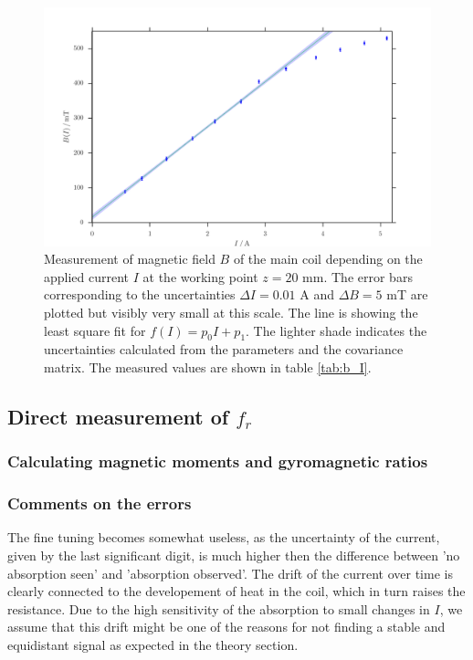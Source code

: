 \begin{figure}[H]
    \includegraphics[width=\textwidth]{figures/b_I.pdf}
    \caption{   
        Measurement of magnetic field $B$ of the main coil depending on the applied current 
        $I$ at the working point $z = 20$ mm. The error bars corresponding 
        to the uncertainties $\Delta I = 0.01$ A 
        and $\Delta B = 5$ mT are plotted but visibly very small at this scale. 
        The line is showing the least square fit for $f(I) = p_0 I + p_1$. The 
        lighter shade indicates the uncertainties calculated from the parameters 
        and the covariance matrix. 
        The measured values are shown in table \ref{tab:b_I}.
        }
    \label{fig:b_I}
\end{figure}


\subsection{Direct measurement of $f_r$}
\subsubsection{Calculating magnetic moments and gyromagnetic ratios}





\subsubsection{Comments on the errors}
The fine tuning becomes somewhat useless, as the uncertainty of the current, given by the last 
significant digit, is much higher then the difference between 'no absorption seen' and 
'absorption observed'. The drift of the current over time is clearly connected to the developement 
of heat in the coil, which in turn raises the resistance. Due to the high sensitivity of the absorption 
to small changes in $I$, we assume that this drift might be one of the reasons for not finding 
a stable and equidistant signal as expected in the theory section. 





